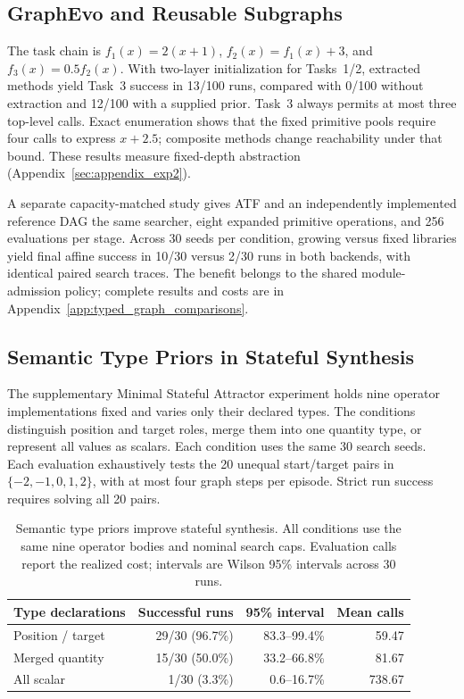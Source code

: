 \subsection{GraphEvo and Reusable Subgraphs}
\label{subsec:graphevo_validation}
The task chain is $f_1(x)=2(x+1)$, $f_2(x)=f_1(x)+3$, and $f_3(x)=0.5f_2(x)$. With two-layer initialization for Tasks~1/2, extracted methods yield Task~3 success in 13/100 runs, compared with 0/100 without extraction and 12/100 with a supplied prior. Task~3 always permits at most three top-level calls. Exact enumeration shows that the fixed primitive pools require four calls to express $x+2.5$; composite methods change reachability under that bound. These results measure fixed-depth abstraction (Appendix~\ref{sec:appendix_exp2}).

A separate capacity-matched study gives ATF and an independently implemented reference DAG the same searcher, eight expanded primitive operations, and 256 evaluations per stage. Across 30 seeds per condition, growing versus fixed libraries yield final affine success in 10/30 versus 2/30 runs in both backends, with identical paired search traces. The benefit belongs to the shared module-admission policy; complete results and costs are in Appendix~\ref{app:typed_graph_comparisons}.

\subsection{Semantic Type Priors in Stateful Synthesis}
\label{subsec:stateful_synthesis}
The supplementary Minimal Stateful Attractor experiment holds nine operator implementations fixed and varies only their declared types. The conditions distinguish position and target roles, merge them into one quantity type, or represent all values as scalars. Each condition uses the same 30 search seeds. Each evaluation exhaustively tests the 20 unequal start/target pairs in $\{-2,-1,0,1,2\}$, with at most four graph steps per episode. Strict run success requires solving all 20 pairs.

\begin{table}[t]
\centering
\caption{Semantic type priors improve stateful synthesis. All conditions use the same nine operator bodies and nominal search caps. Evaluation calls report the realized cost; intervals are Wilson 95\% intervals across 30 runs.}
\label{tab:revision_type_main}
\small
\begin{tabular}{lrrr}
\toprule
Type declarations & Successful runs & 95\% interval & Mean calls \\
\midrule
Position / target & 29/30 (96.7\%) & 83.3--99.4\% & 59.47 \\
Merged quantity & 15/30 (50.0\%) & 33.2--66.8\% & 81.67 \\
All scalar & 1/30 (3.3\%) & 0.6--16.7\% & 738.67 \\
\bottomrule
\end{tabular}
\end{table}

